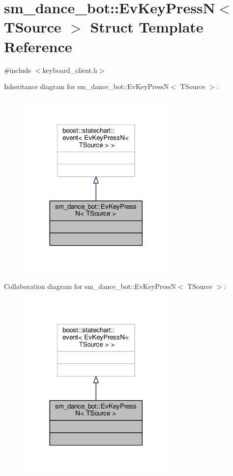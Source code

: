 \hypertarget{structsm__dance__bot_1_1EvKeyPressN}{}\section{sm\+\_\+dance\+\_\+bot\+:\+:Ev\+Key\+PressN$<$ T\+Source $>$ Struct Template Reference}
\label{structsm__dance__bot_1_1EvKeyPressN}


{\ttfamily \#include $<$keyboard\+\_\+client.\+h$>$}



Inheritance diagram for sm\+\_\+dance\+\_\+bot\+:\+:Ev\+Key\+PressN$<$ T\+Source $>$\+:
\nopagebreak
\begin{figure}[H]
\begin{center}
\leavevmode
\includegraphics[width=221pt]{structsm__dance__bot_1_1EvKeyPressN__inherit__graph}
\end{center}
\end{figure}


Collaboration diagram for sm\+\_\+dance\+\_\+bot\+:\+:Ev\+Key\+PressN$<$ T\+Source $>$\+:
\nopagebreak
\begin{figure}[H]
\begin{center}
\leavevmode
\includegraphics[width=221pt]{structsm__dance__bot_1_1EvKeyPressN__coll__graph}
\end{center}
\end{figure}


